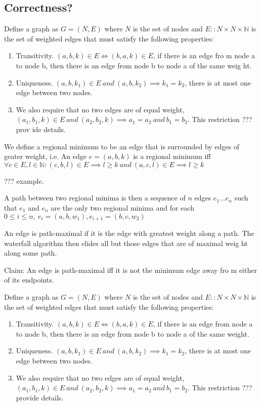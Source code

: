 \documentclass{jfp}
\begin{document}
\subsection{Correctness?}

Define a graph as $G = (N,E)$
where $N$ is the set of nodes and $E :: N\times N \times \mathbb{N}$ is the set
of weighted edges
that must satisfy the following properties:
\begin{enumerate}
\item Transitivity. $(a,b,k) \in E  \iff (b,a,k) \in E$, if there is an edge fro
m node a to node b, then there is an edge from node b to node a of the same weig
ht.
\item Uniqueness.   $(a,b,k_1) \in E\ and\ (a,b,k_2) \implies k_1 = k_2$, there
is at most one edge between two nodes.
\item We also require that no two edges are of equal weight, $(a_1,b_1,k) \in E\
 and\ (a_2,b_2,k) \implies a_1 = a_2\ and\ b_1 = b_2$. This restriction ??? prov
ide details.

\end{enumerate}

We define a regional minimum to be an edge that is surrounded by edges of geater
weight, i.e.
An edge $e = (a,b,k)$ is a regional minimum iff
$\forall c \in E, l \in \mathbb{N} :
  (c,b,l) \in E \implies l \geq k\ and\
  (a,c,l) \in E \implies l \geq k $

??? example.

A path between two regional minima is then a sequence of $n$ edges $e_1 ... e_n$
such that $e_1$ and $e_n$ are the only two regional minima
and for each $ 0 \leq i \le n,\ e_i = (a,b,w_1) , e_{i+1} = (b,c,w_2)$

\noindent An edge is path-maximal if it is the edge with greatest weight along a
 path.
The waterfall algorithm then elides all but those edges that are of maximal weig
ht along some path.

\noindent Claim: An edge is path-maximal iff it is not the minimum edge away fro
m either of its endpoints.



Define a graph as $G = (N,E)$
where $N$ is the set of nodes and $E :: N\times N \times \mathbb{N}$ is the set of weighted edges
that must satisfy the following properties:
\begin{enumerate}
\item Transitivity. $(a,b,k) \in E  \iff (b,a,k) \in E$, if there is an edge from node a to node b, then there is an edge from node b to node a of the same weight.
\item Uniqueness.   $(a,b,k_1) \in E\ and\ (a,b,k_2) \implies k_1 = k_2$, there is at most one edge between two nodes.
\item We also require that no two edges are of equal weight, $(a_1,b_1,k) \in E\ and\ (a_2,b_2,k) \implies a_1 = a_2\ and\ b_1 = b_2$. This restriction ??? provide details.

\end{enumerate}
\end{document}
